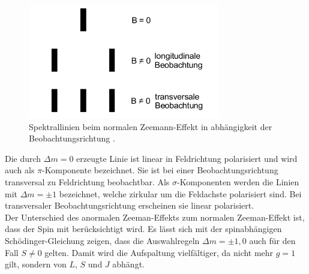 \begin{figure}
  \centering
  \includegraphics[height=5cm]{Punkt.png}
  \caption{Spektrallinien beim normalen Zeemann-Effekt in abhängigkeit
  der Beobachtungsrichtung \cite{skript}.}
  \label{fig:polar}
\end{figure}

Die durch $\Delta m=0$ erzeugte Linie ist linear in Feldrichtung polarisiert und
wird auch als $\pi$-Komponente bezeichnet. Sie ist bei einer Beobachtungsrichtung
transversal zu Feldrichtung beobachtbar. Als $\sigma$-Komponenten
werden die Linien mit $\Delta m=\pm1$ bezeichnet, welche zirkular um die
Feldachste polarisiert sind. Bei transversaler Beobachtungsrichtung erscheinen
sie linear polarisiert.
\\

Der Unterschied des anormalen Zeeman-Effekts zum normalen Zeeman-Effekt ist, dass
der Spin mit berücksichtigt wird. Es lässt sich mit der spinabhängigen
Schödinger-Gleichung zeigen, dass die Auswahlregeln
$\Delta m=\pm1,0$ auch für den Fall $S\neq0$ gelten. Damit wird die Aufspaltung
vielfältiger, da nicht mehr $g=1$ gilt, sondern von $L$, $S$ und $J$ abhängt.
